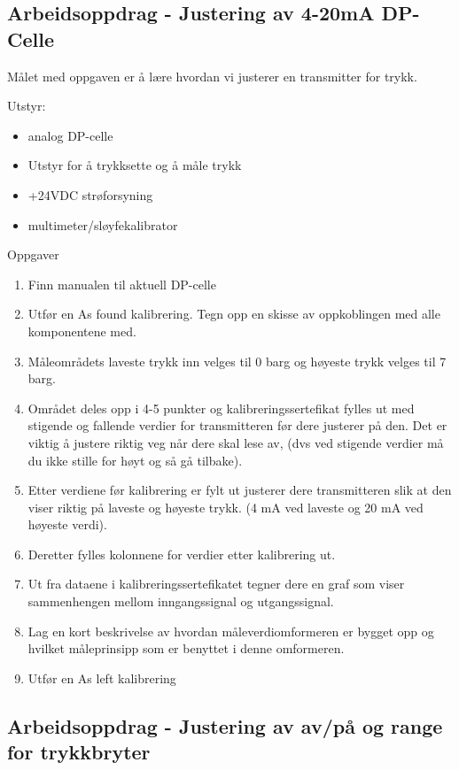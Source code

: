 \subsection{Arbeidsoppdrag - Justering av 4-20mA DP-Celle}

Målet med oppgaven er å lære hvordan vi justerer en transmitter for trykk.


Utstyr:
\begin{itemize}[noitemsep]
	\item analog DP-celle 
	\item Utstyr for å trykksette og å måle trykk 
	\item +24VDC strøforsyning 
	\item multimeter/sløyfekalibrator
\end{itemize}

Oppgaver \begin{enumerate}

	\item Finn manualen til aktuell DP-celle
	\item Utfør en As found kalibrering. Tegn opp en skisse av oppkoblingen med alle komponentene med.
	\item Måleområdets laveste trykk inn velges til 0 barg og høyeste trykk velges til 7 barg.
	\item Området deles opp i 4-5 punkter og kalibreringssertefikat fylles ut med stigende og fallende verdier for transmitteren før dere justerer på den. Det er viktig å justere riktig veg når dere skal lese av, (dvs ved stigende verdier må du ikke stille for høyt og så gå tilbake). 
	\item Etter verdiene før kalibrering er fylt ut justerer dere transmitteren slik at den viser riktig på laveste og høyeste trykk. (4 mA ved laveste og 20 mA ved høyeste verdi).
	\item Deretter fylles kolonnene for verdier etter kalibrering ut.
	\item Ut fra dataene i kalibreringssertefikatet tegner dere en graf som viser sammenhengen mellom inngangssignal og utgangssignal.
	\item Lag en kort beskrivelse av hvordan måleverdiomformeren er bygget opp og hvilket måleprinsipp som er benyttet i denne omformeren.
	\item Utfør en As left kalibrering 
\end{enumerate}



\subsection{Arbeidsoppdrag - Justering av av/på og range for trykkbryter}

